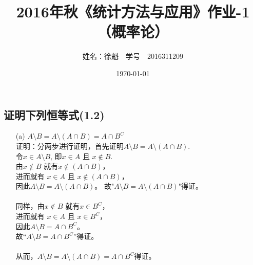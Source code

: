 \documentclass [12pt]{article}
\begin{document}
 \begin{CJK*}{GBK}{kai}
\newtheorem{theorem}{定理}
\newtheorem{definition}{定义}
\newtheorem{lemma}{引理}
\newtheorem{corollary}{推论}
\newtheorem{proposition}{性质}
\newtheorem{example}{例}
\newtheorem{remark}{注}
    \title{2016年秋《统计方法与应用》作业-1（概率论）}
    \author{ 姓名：徐魁\,\,\,\, 学号~~{2016311209}}
    \date{\today}
\maketitle

\section{证明下列恒等式(1.2) }
\begin{enumerate}
  \item[(a)] $A \setminus B = A \setminus (A \cap B) = A \cap B^{C} $\\
 证明：分两步进行证明，首先证明$A \setminus B = A \setminus (A \cap B) $. \\
 令$x \in A \setminus B$, 即$x \in A$ 且 $x \notin B$. \\
 由$x \notin B$ 就有$x \notin ( A \cap B)$，\\
 进而就有 $x \in A$ 且 $x \notin ( A \cap B)$，\\
 因此$A \setminus B = A \setminus (A \cap B) $。
 故"$A \setminus B = A \setminus (A \cap B) $"得证。\\
 \\
 同样，由$x \notin B$ 就有$x \in B^{C}$，\\
进而就有 $x \in A$ 且 $x \in B^{C}$，\\
 因此$A \setminus B = A \cap B^{C} $。\\
 故“$A \setminus B = A \cap B^{C}  $”得证。\\
 \\
 从而，$A \setminus B = A \setminus (A \cap B) = A \cap B^{C} $得证。
 

\end{enumerate}
\end{CJK*}
\end{document}
